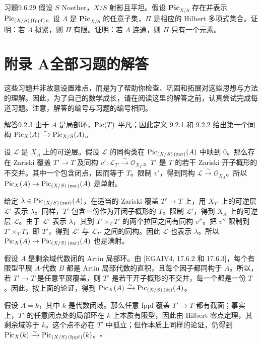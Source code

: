\begin{origstatement}{习题}{9.6.29}\label{appA:ex9629}
假设 $S$ Noether，$X/S$ 射影且平坦。假设 $\mathbf{Pic}_{X/S}$ 存在并表示 $\operatorname{Pic}_{(X/S)\, (\mathrm{fppf})}$。设 $\Lambda$ 是 $\mathbf{Pic}_{X/S}$ 的任意子集，$\Pi$ 是相应的 Hilbert 多项式集合。证明：若 $\Lambda$ 拟紧，则 $\Pi$ 有限。证明：若 $\Lambda$ 连通，则 $\Pi$ 只有一个元素。
\end{origstatement}

\chapter*{附录 A\quad 全部习题的解答}

这些习题并非故意设置难点，而是为了帮助你检查、巩固和拓展对这些思想与方法的理解。因此，为了自己的数学成长，请在阅读这里的解答之前，认真尝试完成每道习题。注意，解答的编号与习题的编号相同。

\begin{origstatement}{解答}{9.2.3}\label{appA:ans923}
由于 $A$ 是局部环，$\operatorname{Pic}(T)$ 平凡；因此定义 9.2.1 和 9.2.2 给出第一个同构 $\operatorname{Pic}_X(A)\xrightarrow{\sim}\operatorname{Pic}_{X/S}(A)$。

设 $\mathcal L$ 是 $X_A$ 上的可逆层。假设 $\mathcal L$ 的同构类在 $\operatorname{Pic}_{(X/S)\,(\mathrm{zar})}(A)$ 中映到 $0$。那么存在 Zariski 覆盖 $T'\to T$ 及同构 $v'\colon\mathcal L_{T'}\xrightarrow{\sim}\mathcal O_{X_{T'}}$。$T'$ 是 $T$ 的若干 Zariski 开子概形的不交并。其中一个包含闭点，因而等于 $T$。限制 $v'$，得到同构 $\mathcal L\xrightarrow{\sim}\mathcal O_{X_A}$。所以 $\operatorname{Pic}_X(A)\to\operatorname{Pic}_{(X/S)\,(\mathrm{zar})}(A)$ 是单射。

给定 $\lambda\in\operatorname{Pic}_{(X/S)\,(\mathrm{zar})}(A)$，在适当的 Zariski 覆盖 $T'\to T$ 上，用 $X_{T'}$ 上的可逆层 $\mathcal L'$ 表示 $\lambda$。同样，$T'$ 包含一份作为开闭子概形的 $T$。限制 $\mathcal L'$，得到 $X_A$ 上的可逆层 $\mathcal L$。由于 $\mathcal L'$ 表示 $\lambda$，其到 $T'\times_T T'$ 的两个拉回之间有同构 $v''$。把 $v''$ 限制到 $T'\times_T T$，即 $T'$，得到 $\mathcal L'$ 与 $\mathcal L_{T'}$ 之间的同构。因此 $\mathcal L$ 也表示 $\lambda$。所以 $\operatorname{Pic}_X(A)\to\operatorname{Pic}_{(X/S)\,(\mathrm{zar})}(A)$ 也是满射。

假设 $A$ 是剩余域代数闭的 Artin 局部环。由 [EGAIV4, 17.6.2 和 17.6.3]，每个有限型平展 $A$-代数 $B$ 都是 Artin 局部代数的直积，且每个因子都同构于 $A$。所以，若 $T'\to T$ 是任意平展覆盖，则 $T'$ 是若干开子概形的不交并，每一个都是一份 $T$。因此，按上面的论证，得到 $\operatorname{Pic}_X(A)\xrightarrow{\sim}\operatorname{Pic}_{(X/S)\,(\text{ét})}(A)$。

假设 $A=k$，其中 $k$ 是代数闭域。那么任意 fppf 覆盖 $T'\to T$ 都有截面；事实上，$T'$ 的任意闭点处的局部环在 $k$ 上本质有限型，因此由 Hilbert 零点定理，其剩余域等于 $k$。这个点不必在 $T'$ 中孤立；但作本质上同样的论证，仍得到 $\operatorname{Pic}_X(k)\xrightarrow{\sim}\operatorname{Pic}_{(X/S)\,(\mathrm{fppf})}(k)$。\hfill$\square$
\end{origstatement}

